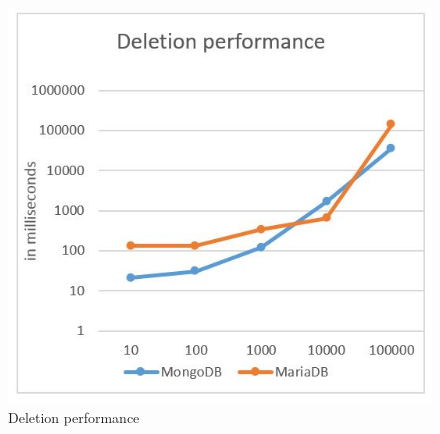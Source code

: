 \begin{figure}[H]
\includegraphics[width=\linewidth,keepaspectratio]{images/Performance_Deletion.JPG}
\caption{Deletion performance}
\label{arch-example4}
\end{figure}

